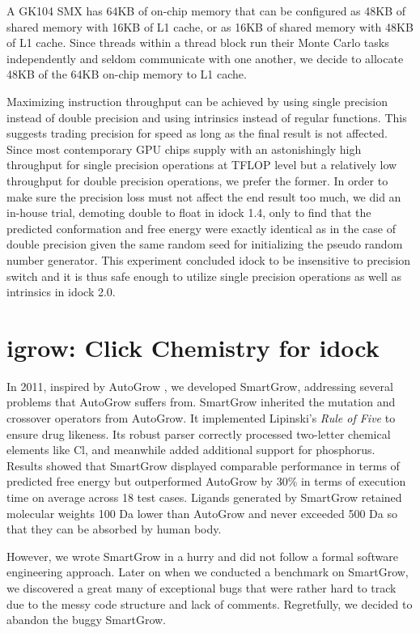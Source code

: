 A GK104 SMX has 64KB of on-chip memory that can be configured as 48KB of shared memory with 16KB of L1 cache, or as 16KB of shared memory with 48KB of L1 cache. Since threads within a thread block run their Monte Carlo tasks independently and seldom communicate with one another, we decide to allocate 48KB of the 64KB on-chip memory to L1 cache.

Maximizing instruction throughput can be achieved by using single precision instead of double precision and using intrinsics instead of regular functions. This suggests trading precision for speed as long as the final result is not affected. Since most contemporary GPU chips supply with an astonishingly high throughput for single precision operations at TFLOP level but a relatively low throughput for double precision operations, we prefer the former. In order to make sure the precision loss must not affect the end result too much, we did an in-house trial, demoting double to float in idock 1.4, only to find that the predicted conformation and free energy were exactly identical as in the case of double precision given the same random seed for initializing the pseudo random number generator. This experiment concluded idock to be insensitive to precision switch and it is thus safe enough to utilize single precision operations as well as intrinsics in idock 2.0.

\section{igrow: Click Chemistry for idock}

In 2011, inspired by AutoGrow \citep{466}, we developed SmartGrow, addressing several problems that AutoGrow suffers from. SmartGrow inherited the mutation and crossover operators from AutoGrow. It implemented Lipinski's \textit{Rule of Five} \citep{168} to ensure drug likeness. Its robust parser correctly processed two-letter chemical elements like Cl, and meanwhile added additional support for phosphorus. Results showed that SmartGrow displayed comparable performance in terms of predicted free energy but outperformed AutoGrow by 30\% in terms of execution time on average across 18 test cases. Ligands generated by SmartGrow retained molecular weights 100 Da lower than AutoGrow and never exceeded 500 Da so that they can be absorbed by human body. 

However, we wrote SmartGrow in a hurry and did not follow a formal software engineering approach. Later on when we conducted a benchmark on SmartGrow, we discovered a great many of exceptional bugs that were rather hard to track due to the messy code structure and lack of comments. Regretfully, we decided to abandon the buggy SmartGrow.

